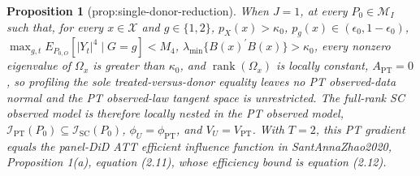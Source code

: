 \documentclass{article}
\newtheorem{proposition}{Proposition}
\begin{document}
\begin{proposition}[prop:single-donor-reduction]\label{prop:single-donor-reduction}
When \(J=1\), at every \(P_0\in\mathcal M_I\) such that, for every \(x\in\mathcal X\) and \(g\in\{1,2\}\), \(p_X(x)>\kappa_0\), \(p_g(x)\in(\epsilon_0,1-\epsilon_0)\), \(\max_{g,t}E_{P_{0,O}}[|Y_t|^4\mid G=g]<M_4\), \(\lambda_{\min}\{B(x)^{\prime}B(x)\}>\kappa_0\), every nonzero eigenvalue of \(\Omega_x\) is greater than \(\kappa_0\), and \(\operatorname{rank}(\Omega_x)\) is locally constant, \(A_{\mathrm{PT}}=0\), so profiling the sole treated-versus-donor equality leaves no PT observed-data normal and the PT observed-law tangent space is unrestricted. The full-rank SC observed model is therefore locally nested in the PT observed model, \(\mathcal I_{\mathrm{PT}}(P_0)\subseteq\mathcal I_{\mathrm{SC}}(P_0)\), \(\phi_U=\phi_{\mathrm{PT}}\), and \(V_U=V_{\mathrm{PT}}\). With \(T=2\), this PT gradient equals the panel-DiD ATT efficient influence function in SantAnnaZhao2020, Proposition 1(a), equation (2.11), whose efficiency bound is equation (2.12).
\end{proposition}
\end{document}
